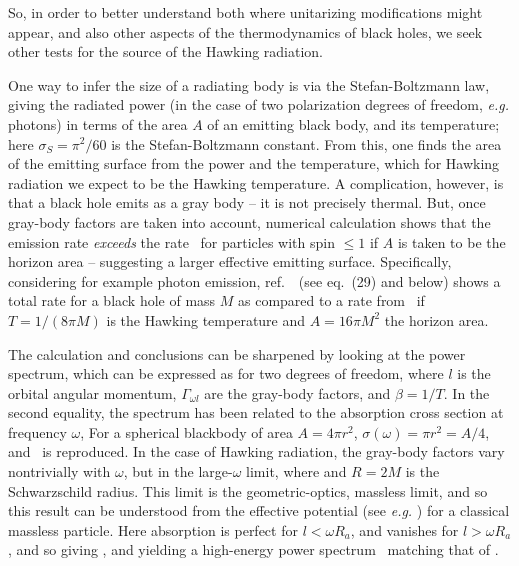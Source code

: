 So, in order to better understand both where unitarizing modifications might appear, and also other aspects of the thermodynamics of black holes, we seek other tests for the source of the Hawking radiation.   

One way to infer the size of a radiating body is via the Stefan-Boltzmann law, giving the radiated power (in the case of two polarization degrees of freedom, {\it e.g.} photons)
%
\eqn{}
%
in terms of the area $A$ of an emitting black body, and its temperature; here $\sigma_{S}=\pi^2/60$ is the Stefan-Boltzmann constant.  From this, one finds the area of the emitting surface from the power and the temperature, which for Hawking radiation we expect to be the Hawking temperature.  
A complication, however, is that a black hole emits as a gray body -- it is not precisely thermal.  But, once gray-body factors are taken into account, numerical calculation shows that the emission rate {\it exceeds} the rate \SB\ for particles with spin $\leq1$ if $A$ is taken to be the horizon area -- suggesting a larger effective emitting surface.  Specifically, considering for example photon emission, ref.~\Page\ (see eq.~(29) and below) shows a total rate for a black hole of mass $M$
%
\eqn{}
%
 as compared to a rate 
 \eqn{}
 from \SB\ if $T=1/(8\pi M)$ is the Hawking temperature and $A=16\pi M^2$ the horizon area.

The calculation and conclusions can be sharpened by looking at the power spectrum, which can be expressed as
%
\eqn{}
%
for two degrees of freedom, where $l$ is the orbital angular momentum, $\Gamma_{\omega l}$ are the gray-body factors, and $\beta=1/T$.  In the second equality, the spectrum has been related to the absorption cross section at frequency $\omega$,
%
\eqn{}
%
For a spherical blackbody of area $A=4\pi r^2$, $\sigma(\omega)=\pi r^2 = A/4$, and \SB\ is reproduced.  In the case of Hawking radiation, the gray-body factors vary nontrivially with $\omega$, but in the large-$\omega$ limit, 
%
\eqn{}
%
where
%
\eqn{}
%
and $R=2M$ is the Schwarzschild radius.
This limit is the geometric-optics, massless limit, and so this result can be understood from the effective potential (see {\it e.g.} ) for a classical massless particle.  Here absorption is perfect for $l<\omega R_a$, and vanishes for $l>\omega R_a$, and so
%
\eqn{}
%
giving \HEsigma, and yielding a high-energy power spectrum \pspec\ matching that of \Page.

